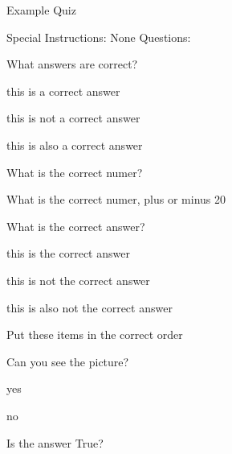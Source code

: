 \documentclass[letterpaper,10pt]{article}
\begin{document}
\begin{center}
{\Large Example Quiz}
\end{center}

Special Instructions:
None
\vspace{10pt}
Questions:
\vspace{10pt}

\begin{compactenum}
\item What answers are correct?
\begin{compactenum}
\item this is a correct answer
\item this is not a correct answer
\item this is also a correct answer
\end{compactenum}
\item What is the correct numer?

\item What is the correct numer, plus or minus 20%

\item What is the correct answer?
\begin{compactenum}
\item this is the correct answer
\item this is not the correct answer
\item this is also not the correct answer
\end{compactenum}
\item Put these items in the correct order

\item Can you see the picture?
\begin{compactenum}
\item yes
\item no
\end{compactenum}
\item Is the answer True?

\end{compactenum}
\end{document}
